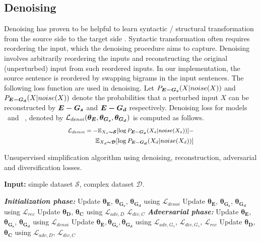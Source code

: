 \documentclass[11pt,a4paper]{article}
\begin{document}
\subsection{Denoising}
\label{sec:denoising}
Denoising has proven to be helpful to learn syntactic / structural transformation from the source side to the target side \cite{artetxe2018iclr}. Syntactic transformation often requires reordering the input, which the denoising procedure aims to capture. Denoising involves arbitrarily reordering the inputs and reconstructing the original (unperturbed) input from such reordered inputs. In our implementation, the source sentence is reordered by swapping bigrams in the input sentences. The following loss function are used in denoising. Let $P_{\boldsymbol{E-G_s}}(X|noise(X))$ and $P_{\boldsymbol{E-G_d}}(X|noise(X))$ denote the probabilities that a perturbed input $X$ can be reconstructed by $\boldsymbol{E-G_s}$ and $\boldsymbol{E-G_d}$ respectively. Denoising loss for models \simplf\ and \compl\ , denoted by $\mathcal{L}_{denoi}(\boldsymbol{\theta_E},\boldsymbol{\theta_{G_s}}, \boldsymbol{\theta_{G_d}})$ is computed as follows.
\begin{align}
\footnotesize
 \mathcal{L}_{denoi} = -\mathbb{E}_{X_s\boldsymbol{ \sim  \mathcal{S}}}[\log{P_{\boldsymbol{E-G_s}}(X_s|noise(X_s)})] - \nonumber \\
\small
 \mathbb{E}_{X_d\boldsymbol{ \sim  \mathcal{D}}}[\log{P_{\boldsymbol{E-G_d}}(X_d|noise(X_d))}]
 \label{eqn:denoising}
\end{align}
\begin{algorithm}[t]
\caption{Unsupervised simplification algorithm using denoising, reconstruction, adversarial and diversification losses. }
\label{algo:algo1}
\textbf{Input:} simple dataset $\boldsymbol{\mathcal{{S}}}$, complex dataset $\boldsymbol{\mathcal{{D}}}$.
\begin{algorithmic}
\State \textbf{\textit{Initialization phase:}}
\Repeat
\State Update $\boldsymbol{\theta_E}$, $\boldsymbol{\theta_{G_s}}$, $\boldsymbol{\theta_{G_d}}$ using $\mathcal{L}_{denoi}$
\State Update $\boldsymbol{\theta_E}$, $\boldsymbol{\theta_{G_s}}$, $\boldsymbol{\theta_{G_d}}$ using $\mathcal{L}_{rec}$
\State Update $\boldsymbol{\theta_D}$, $\boldsymbol{\theta_C}$ using $\mathcal{L}_{adv,D}$ $\mathcal{L}_{div,C}$
\State \textbf{\textit{Adversarial phase:}}
\Repeat
\State Update $\boldsymbol{\theta_E}$, $\boldsymbol{\theta_{G_s}}$, $\boldsymbol{\theta_{G_d}}$ using $\mathcal{L}_{denoi}$
\State Update $\boldsymbol{\theta_E},\boldsymbol{\theta_{G_s}},\boldsymbol{\theta_{G_d}}$ using $\mathcal{L}_{adv,G_s}$, $\mathcal{L}_{div,G_s}$, $\mathcal{L}_{rec}$
\State Update $\boldsymbol{\theta_D}$, $\boldsymbol{\theta_C}$ using $\mathcal{L}_{adv,D}$, $\mathcal{L}_{div,C}$
\end{algorithmic}
\end{algorithm}
\end{document}
